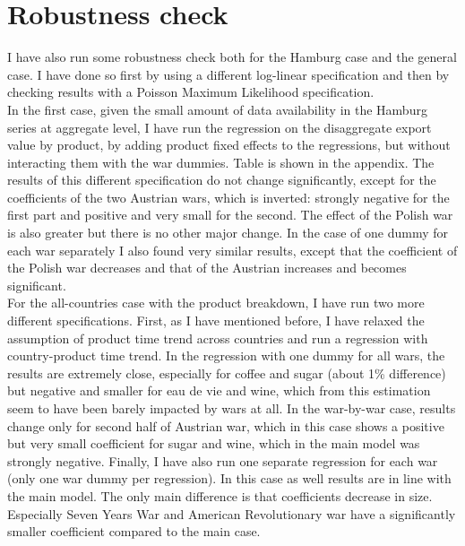 \documentclass[12pt,a4paper,titlepage]{article}
\begin{document}
\section{Robustness check}
I have also run some robustness check both for the Hamburg case and the general case. I have done so first by using a different log-linear specification and then by checking results with a Poisson Maximum Likelihood specification. \\
In the first case, given the small amount of data availability in the Hamburg series at aggregate level, I have run the regression on the disaggregate export value by product, by adding product fixed effects to the regressions, but without interacting them with the war dummies. Table is shown in the appendix. The results of this different specification do not change significantly, except for the coefficients of the two Austrian wars, which is inverted: strongly negative for the first part and positive and very small for the second. The effect of the Polish war is also greater but there is no other major change. In the case of one dummy for each war separately I also found very similar results, except that the coefficient of the Polish war decreases and that of the Austrian increases and becomes significant.\\
For the all-countries case with the product breakdown, I have run two more different specifications. First, as I have mentioned before, I have relaxed the assumption of product time trend across countries and run a regression with country-product time trend. In the regression with one dummy for all wars, the results are extremely close, especially for coffee and sugar (about 1\% difference) but negative and smaller for eau de vie and wine, which from this estimation seem to have been barely impacted by wars at all. In the war-by-war case, results change only for second half of Austrian war, which in this case shows a positive but very small coefficient for sugar and wine, which in the main model was strongly negative. Finally, I have also run one separate regression for each war (only one war dummy per regression). In this case as well results are in line with the main model. The only main difference is that coefficients decrease in size. Especially Seven Years War and American Revolutionary war  have a significantly smaller coefficient compared to the main case. \\
\end{document}
